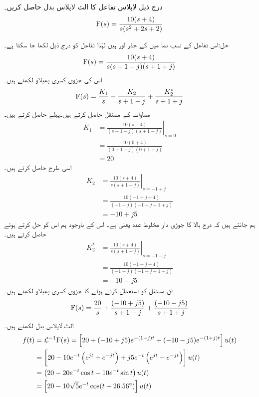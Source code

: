 درج ذیل لاپلاس تفاعل کا الٹ لاپلاس بدل حاصل کریں۔
\begin{align*}
{\ensuremath{{\textup{F}}}}(s)=\frac{10(s+4)}{s(s^2+2s+2)}
\end{align*}

حل:اس تفاعل کے نسب نما میں  کے جذر  اور  ہیں لہٰذا تفاعل کو درج ذیل لکھا جا سکتا ہے۔
\begin{align*}
{\ensuremath{{\textup{F}}}}(s)=\frac{10(s+4)}{s(s+1-j)(s+1+j)}
\end{align*}
اس کی جزوی کسری پھیلاو لکھتے ہیں۔
\begin{align*}
{\ensuremath{{\textup{F}}}}(s)=\frac{K_1}{s}+\frac{K_2}{s+1-j}+\frac{K^*_2}{s+1+j}
\end{align*}
مساوات کے مستقل حاصل کرتے ہیں۔پہلے  حاصل کرتے ہیں۔
\begin{align*}
K_1&=\left. \frac{10(s+4)}{(s+1-j)(s+1+j)} \right|_{s=0}\\
&=\frac{10(0+4)}{(0+1-j)(0+1+j)} \\
&=20
\end{align*}
اسی طرح  حاصل کرتے ہیں۔
\begin{align*}
K_2&=\left. \frac{10(s+4)}{s(s+1+j)} \right|_{s=-1+j}\\
&=\frac{10(-1+j+4)}{(-1+j)(-1+j+1+j)} \\
&=-10+j5
\end{align*}
ہم جانتے ہیں کہ  درج بالا کا جوڑی دار مخلوط عدد یعنی  ہے۔ اس کے باوجود ہم اس کو حل کرتے ہوئے حاصل کرتے ہیں۔
 \begin{align*}
K^*_2&=\left. \frac{10(s+4)}{s(s+1-j)} \right|_{s=-1-j}\\
&=\frac{10(-1-j+4)}{(-1-j)(-1-j+1-j)} \\
&=-10-j5
\end{align*}
ان مستقل کو استعمال کرتے ہوئے   کا جزوی کسری پھیلاو  لکھتے ہیں۔
\begin{align*}
{\ensuremath{{\textup{F}}}}(s)=\frac{20}{s}+\frac{(-10+j5)}{s+1-j}+\frac{(-10-j5)}{s+1+j}
\end{align*}
الٹ لاپلاس بدل لکھتے ہیں۔
\begin{align*}
f(t)&=\mathcal{L}^{-1} {{\textup{F}}}(s)=\left[20+(-10+j5)e^{-(1-j)t}+(-10-j5)e^{-(1+j)t}\right]u(t)\\
&=\left[20-10e^{-t} \left(e^{jt}+e^{-jt}\right)+j5e^{-t}\left(e^{jt}-e^{-jt}\right)\right]u(t)\\
&=\left(20-20e^{-t}\cos t-10e^{-t}\sin t\right)u(t)\\
&=\left[20-10\sqrt{5}e^{-t}\cos(t+26.56^{\circ})\right]u(t)
\end{align*}

